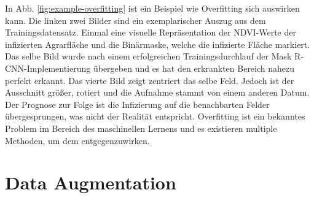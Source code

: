 \noindent
In Abb. \ref{fig:example-overfitting} ist ein Beispiel wie Overfitting sich auswirken kann. Die linken zwei Bilder sind ein exemplarischer Auszug aus dem Trainingsdatensatz. Einmal eine visuelle Repräsentation der NDVI-Werte der infizierten Agrarfläche und die Binärmaske, welche die infizierte Fläche markiert. Das selbe Bild wurde nach einem erfolgreichen Trainingsdurchlauf der Mask R-CNN-Implementierung übergeben und es hat den erkrankten Bereich nahezu perfekt erkannt. Das vierte Bild zeigt zentriert das selbe Feld. Jedoch ist der Ausschnitt größer, rotiert und die Aufnahme stammt von einem anderen Datum. Der Prognose zur Folge ist die Infizierung auf die benachbarten Felder übergesprungen, was nicht der Realität entspricht. Overfitting ist ein bekanntes Problem im Bereich des maschinellen Lernens und es existieren multiple Methoden, um dem entgegenzuwirken.

\section{Data Augmentation}\label{sec:augmentation}

